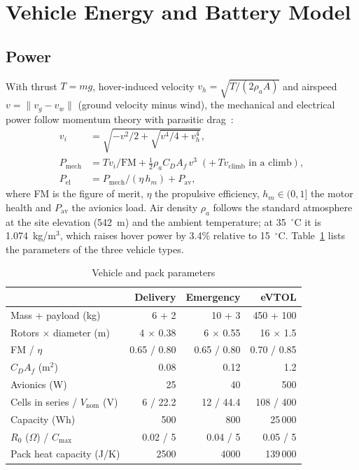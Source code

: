 \documentclass[journal]{IEEEtran}
\begin{document}
\section{Vehicle Energy and Battery Model}\label{sec:battery}

\subsection{Power}
With thrust $T = mg$, hover-induced velocity $v_h = \sqrt{T/(2\rho_a A)}$ and airspeed $v = \|v_g - v_w\|$ (ground velocity minus wind), the mechanical and electrical power follow momentum theory with parasitic drag~\cite{leishman2006principles}:
\begin{align}
v_i &= \sqrt{-v^2/2 + \sqrt{v^4/4 + v_h^4}},\\
P_{\mathrm{mech}} &= T v_i / \mathrm{FM} + \tfrac{1}{2}\rho_a C_D A_f\, v^3 \;(+\, T v_{\mathrm{climb}} \text{ in a climb}),\\
P_{\mathrm{el}} &= P_{\mathrm{mech}}/(\eta\, h_m) + P_{\mathrm{av}},
\end{align}
where FM is the figure of merit, $\eta$ the propulsive efficiency, $h_m \in (0,1]$ the motor health and $P_{\mathrm{av}}$ the avionics load. Air density $\rho_a$ follows the standard atmosphere at the site elevation (542~m) and the ambient temperature; at 35~$^\circ$C it is 1.074~kg/m$^3$, which raises hover power by 3.4\% relative to 15~$^\circ$C. Table~\ref{tab:vehicles} lists the parameters of the three vehicle types.

\begin{table}[t]
\centering
\caption{Vehicle and pack parameters}
\label{tab:vehicles}
\footnotesize
\setlength{\tabcolsep}{3pt}
\begin{tabular}{@{}lrrr@{}}
\toprule
 & Delivery & Emergency & eVTOL \\
\midrule
Mass + payload (kg) & 6 + 2 & 10 + 3 & 450 + 100 \\
Rotors $\times$ diameter (m) & 4 $\times$ 0.38 & 6 $\times$ 0.55 & 16 $\times$ 1.5 \\
FM / $\eta$ & 0.65 / 0.80 & 0.65 / 0.80 & 0.70 / 0.85 \\
$C_D A_f$ (m$^2$) & 0.08 & 0.12 & 1.2 \\
Avionics (W) & 25 & 40 & 500 \\
Cells in series / $V_{\mathrm{nom}}$ (V) & 6 / 22.2 & 12 / 44.4 & 108 / 400 \\
Capacity (Wh) & 500 & 800 & 25\,000 \\
$R_0$ ($\Omega$) / $C_{\max}$ & 0.02 / 5 & 0.04 / 5 & 0.05 / 5 \\
Pack heat capacity (J/K) & 2500 & 4000 & 139\,000 \\
\bottomrule
\end{tabular}
\end{table}
\end{document}
